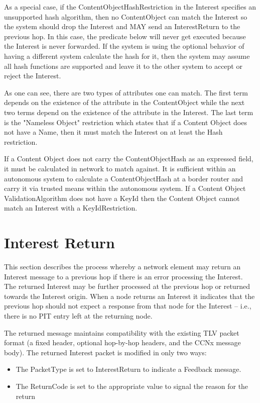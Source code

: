 \documentclass[12pt]{article}
\begin{document}
As a special case, if the ContentObjectHashRestriction in the
Interest specifies an unsupported hash algorithm, then no
ContentObject can match the Interest so the system should drop the
Interest and MAY send an InterestReturn to the previous hop.  In this
case, the predicate below will never get executed because the
Interest is never forwarded.  If the system is using the optional
behavior of having a different system calculate the hash for it, then
the system may assume all hash functions are supported and leave it
to the other system to accept or reject the Interest.


As one can see, there are two types of attributes one can match.  The
first term depends on the existence of the attribute in the
ContentObject while the next two terms depend on the existence of the
attribute in the Interest.  The last term is the "Nameless Object"
restriction which states that if a Content Object does not have a
Name, then it must match the Interest on at least the Hash
restriction.

If a Content Object does not carry the ContentObjectHash as an
expressed field, it must be calculated in network to match against.
It is sufficient within an autonomous system to calculate a
ContentObjectHash at a border router and carry it via trusted means
within the autonomous system.  If a Content Object
ValidationAlgorithm does not have a KeyId then the Content Object
cannot match an Interest with a KeyIdRestriction.

\section{Interest Return}
This section describes the process whereby a network element may
return an Interest message to a previous hop if there is an error
processing the Interest.  The returned Interest may be further
processed at the previous hop or returned towards the Interest
origin.  When a node returns an Interest it indicates that the
previous hop should not expect a response from that node for the
Interest -- i.e., there is no PIT entry left at the returning node.

The returned message maintains compatibility with the existing TLV
packet format (a fixed header, optional hop-by-hop headers, and the
CCNx message body).  The returned Interest packet is modified in only
two ways:

\begin{itemize}
\item  The PacketType is set to InterestReturn to indicate a Feedback
   message.

\item  The ReturnCode is set to the appropriate value to signal the
   reason for the return
\end{itemize}
\end{document}
